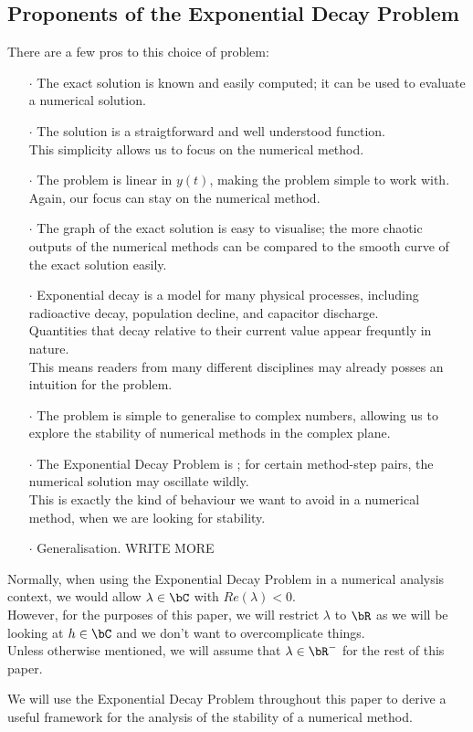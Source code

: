 \subsection{Proponents of the Exponential Decay Problem}
\par There are a few pros to this choice of problem:
\begin{itemize}
    \item[$\cdot$] The exact solution is known and easily computed; it can be used to evaluate a numerical solution.
    \item[$\cdot$] The solution is a straigtforward and well understood function.\\
    	  This simplicity allows us to focus on the numerical method.
    \item[$\cdot$] The problem is linear in $y(t)$, making the problem simple to work with.\\
    	  Again, our focus can stay on the numerical method.
    \item[$\cdot$] The graph of the exact solution is easy to visualise; the more chaotic outputs of the numerical methods can be compared to the smooth curve of the exact solution easily.
    \item[$\cdot$] Exponential decay is a model for many physical processes, including radioactive decay, population decline, and capacitor discharge.\\
    	  Quantities that decay relative to their current value appear frequntly in nature.\\
    	  This means readers from many different disciplines may already posses an intuition for the problem.
    \item[$\cdot$] The problem is simple to generalise to complex numbers, allowing us to explore the stability of numerical methods in the complex plane.
    \item[$\cdot$] The Exponential Decay Problem is ; for certain method-step pairs, the numerical solution may oscillate wildly.\\
    	  This is exactly the kind of behaviour we want to avoid in a numerical method, when we are looking for stability.
    \item[$\cdot$] Generalisation. WRITE MORE
\end{itemize}

\par Normally, when using the Exponential Decay Problem in a numerical analysis context, we would allow $\lambda \in \bC$ with $Re(\lambda)<0$.\\
However, for the purposes of this paper, we will restrict $\lambda$ to $\bR$ as we will be looking at $h \in \bC$ and we don't want to overcomplicate things.\\
Unless otherwise mentioned, we will assume that $\lambda \in \bR^{-}$ for the rest of this paper.\\

\par We will use the Exponential Decay Problem throughout this paper to derive a useful framework for the analysis of the stability of a numerical method.\\
